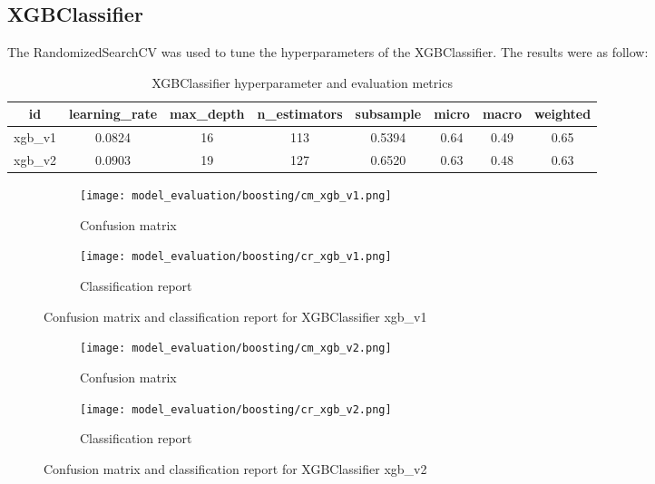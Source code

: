 \subsection{XGBClassifier}
The RandomizedSearchCV was used to tune the hyperparameters of the XGBClassifier. The results were as follow:

\begin{table}[H]
    \begin{center}
        \begin{tabular}{ |c|c|c|c|c|c|c|c| }
            \hline
            id      & learning\_rate & max\_depth & n\_estimators & subsample & micro & macro & weighted \\
            \hline
            xgb\_v1 & 0.0824         & 16         & 113           & 0.5394    & 0.64  & 0.49  & 0.65     \\
            \hline
            xgb\_v2 & 0.0903         & 19         & 127           & 0.6520    & 0.63  & 0.48  & 0.63     \\
            \hline
        \end{tabular}
    \end{center}
    \caption{XGBClassifier hyperparameter and evaluation metrics}
\end{table}

\begin{figure}[H]
    \centering
    \begin{subfigure}[b]{0.5\textwidth}
        \texttt{[image: model\_evaluation/boosting/cm\_xgb\_v1.png]}
        \caption{Confusion matrix}
    \end{subfigure}
    \hfill
    \begin{subfigure}[b]{0.4\textwidth}
        \texttt{[image: model\_evaluation/boosting/cr\_xgb\_v1.png]}
        \caption{Classification report}
    \end{subfigure}
    \caption{Confusion matrix and classification report for XGBClassifier xgb\_v1}
\end{figure}

\begin{figure}[H]
    \centering
    \begin{subfigure}[b]{0.5\textwidth}
        \texttt{[image: model\_evaluation/boosting/cm\_xgb\_v2.png]}
        \caption{Confusion matrix}
    \end{subfigure}
    \hfill
    \begin{subfigure}[b]{0.4\textwidth}
        \texttt{[image: model\_evaluation/boosting/cr\_xgb\_v2.png]}
        \caption{Classification report}
    \end{subfigure}
    \caption{Confusion matrix and classification report for XGBClassifier xgb\_v2}
\end{figure}

